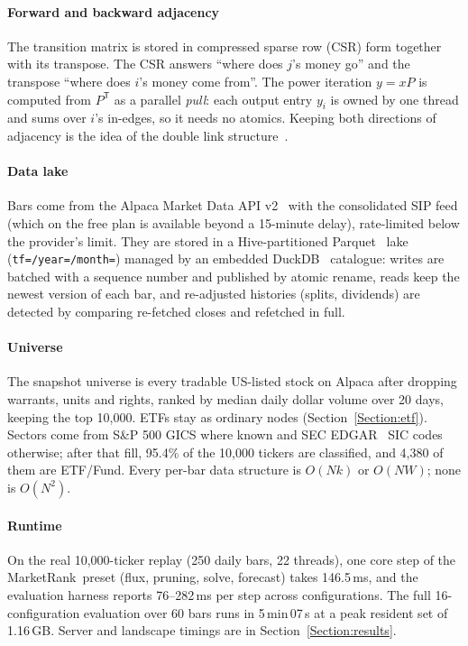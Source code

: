 \documentclass[preprint,3p,twocolumn]{elsarticle}
\newcommand{\MR}{MarketRank}
\begin{document}
\paragraph{Forward and backward adjacency} The transition matrix is stored in compressed sparse row (CSR) form together with its transpose. The CSR answers ``where does $j$'s money go'' and the transpose ``where does $i$'s money come from''. The power iteration $y=xP$ is computed from $P^{\mathsf T}$ as a parallel \emph{pull}: each output entry $y_i$ is owned by one thread and sums over $i$'s in-edges, so it needs no atomics. Keeping both directions of adjacency is the idea of the double link structure~\cite{dls}.

\paragraph{Data lake} Bars come from the Alpaca Market Data API v2~\cite{alpaca} with the consolidated SIP feed (which on the free plan is available beyond a 15-minute delay), rate-limited below the provider's limit. They are stored in a Hive-partitioned Parquet~\cite{parquet} lake (\texttt{tf=/year=/month=}) managed by an embedded DuckDB~\cite{duckdb} catalogue: writes are batched with a sequence number and published by atomic rename, reads keep the newest version of each bar, and re-adjusted histories (splits, dividends) are detected by comparing re-fetched closes and refetched in full.

\paragraph{Universe} The snapshot universe is every tradable US-listed stock on Alpaca after dropping warrants, units and rights, ranked by median daily dollar volume over 20 days, keeping the top 10,000. ETFs stay as ordinary nodes (Section~\ref{Section:etf}). Sectors come from S\&P 500 GICS where known and SEC EDGAR~\cite{edgar} SIC codes otherwise; after that fill, 95.4\% of the 10,000 tickers are classified, and 4,380 of them are ETF/Fund. Every per-bar data structure is $O(Nk)$ or $O(NW)$; none is $O(N^2)$.

\paragraph{Runtime} On the real 10,000-ticker replay (250 daily bars, 22 threads), one core step of the \MR\ preset (flux, pruning, solve, forecast) takes 146.5\,ms, and the evaluation harness reports 76--282\,ms per step across configurations. The full 16-configuration evaluation over 60 bars runs in 5\,min\,07\,s at a peak resident set of 1.16\,GB. Server and landscape timings are in Section~\ref{Section:results}.
\end{document}
